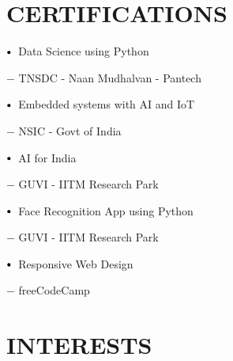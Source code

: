 \documentclass[letterpaper,11pt]{article}
\newcommand\sbullet[1][.5]{\mathbin{\vcenter{\hbox{\scalebox{#1}{$\bullet$}}}}}
\begin{document}
 \section{CERTIFICATIONS}
 
$\sbullet[.75] \hspace{0.1cm}$ {Data Science using Python }{\href{https://www.pantechelearning.com/MAY23/PEL_NM_PARTDSA_663.pdf} {\raisebox{-0.1\height}\faExternalLink } $-$ \large{{TNSDC - Naan Mudhalvan - Pantech}} \hspace{1.7cm}\\
 \vspace{2pt}

$\sbullet[.75] \hspace{0.1cm}$ {Embedded systems with AI and IoT }{\href{https://drive.google.com/file/d/1vHHzB53UABYKYKE0eHIcSdxRWTuKqPvg/view?usp=drive_link} {\raisebox{-0.1\height}\faExternalLink } $-$ \large{{NSIC - Govt of India}} \hspace{1.7cm}\\
 \vspace{2pt}

$\sbullet[.75] \hspace{0.1cm}$ {AI for India  }{\href{https://www.guvi.in/verify-certificate?id=941y56i91j065hI47A} {\raisebox{-0.1\height}\faExternalLink } $-$ \large{{GUVI - IITM Research Park}} \hspace{1.7cm}\\
 \vspace{2pt}

$\sbullet[.75] \hspace{0.1cm}$ {Face Recognition App using Python }{\href{https://www.guvi.in/verify-certificateid=u8933f16214cK5tTqs#} {\raisebox{-0.1\height}\faExternalLink } $-$ \large{{GUVI - IITM Research Park}} \hspace{1.7cm}\\
 \vspace{2pt}

$\sbullet[.75] \hspace{0.1cm}$ {Responsive Web Design }{\href{https://freecodecamp.org/certification/fcc9b4c3c65-392b-4ac7-a770-b8a2c376b85c/responsive-web-design} {\raisebox{-0.1\height}\faExternalLink } $-$ \large{{freeCodeCamp}} \hspace{1.7cm}\\

\section{INTERESTS}

}}}}}
\end{document}
